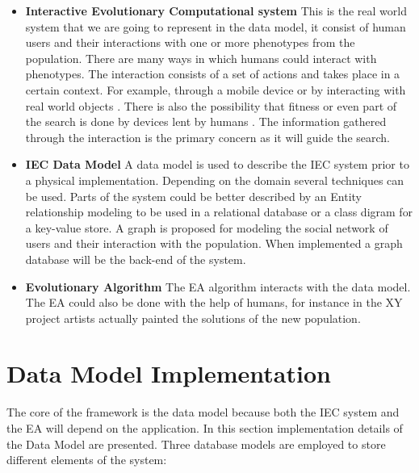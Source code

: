 \begin{itemize}
  \item {\bf Interactive Evolutionary Computational system} 
  This is the real world system that we are going to represent in the data model, 
  it consist of human users and their interactions with one or more phenotypes
  from the population. There are many ways in which humans could interact 
  with phenotypes. The interaction consists of a set of actions and 
  takes place in a certain context. For example, through a mobile device  
  or by interacting with real world objects 
  \cite{de2014artists,de2013unplugging}. 
  There is also the possibility that fitness or even part of the search 
  is done by devices lent by humans \cite{DBLP:conf/gecco/MereloCGCRV16}.
  The information gathered through the interaction is the primary concern
  as it will guide the search. 

  \item {\bf IEC Data Model}
  A data model is used to describe the IEC system prior to a physical 
  implementation.  Depending on the domain several techniques can be used.
  Parts of the system could be better described by an Entity relationship 
  modeling to be used in a relational database or a class digram for a 
  key-value store. A graph is proposed for modeling the social network of users 
  and their interaction with the population. When implemented a graph database 
  will be the back-end of the system. 

  \item {\bf Evolutionary Algorithm} 
  The EA algorithm interacts with the data model. The EA could also be done with the help of
  humans, for instance in the XY project \cite{de2013unplugging} artists actually painted
  the solutions of the new population.  
\end{itemize}

\section{Data Model Implementation}
\label{sec:implementation}

The core of the framework is the data model because both the IEC system and the EA will 
depend on the application. In this section implementation details of the Data Model are presented.
Three database models are employed to store different elements of the system: 

